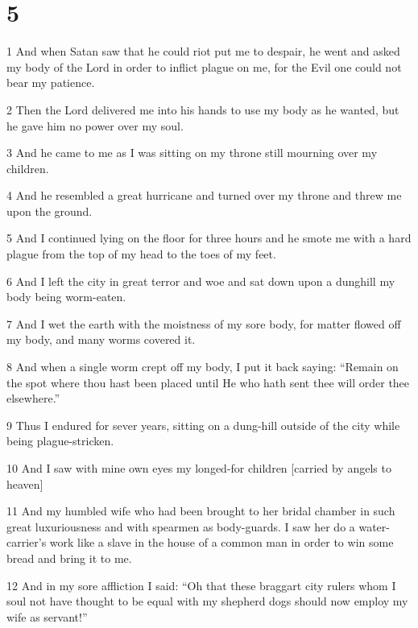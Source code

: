 \chapter{5}

\par 1 And when Satan saw that he could riot put me to despair, he went and asked my body of the Lord in order to inflict plague on me, for the Evil one could not bear my patience.

\par 2 Then the Lord delivered me into his hands to use my body as he wanted, but he gave him no power over my soul. 

\par 3 And he came to me as I was sitting on my throne still mourning over my children.

\par 4 And he resembled a great hurricane and turned over my throne and threw me upon the ground.

\par 5 And I continued lying on the floor for three hours and he smote me with a hard plague from the top of my head to the toes of my feet.

\par 6 And I left the city in great terror and woe and sat down upon a dunghill my body being worm-eaten.

\par 7 And I wet the earth with the moistness of my sore body, for matter flowed off my body, and many worms covered it.

\par 8 And when a single worm crept off my body, I put it back saying: “Remain on the spot where thou hast been placed until He who hath sent thee will order thee elsewhere.”

\par 9 Thus I endured for sever years, sitting on a dung-hill outside of the city while being plague-stricken.

\par 10 And I saw with mine own eyes my longed-for children [carried by angels to heaven]

\par 11 And my humbled wife who had been brought to her bridal chamber in such great luxuriousness and with spearmen as body-guards. I saw her do a water-carrier's work like a slave in the house of a common man in order to win some bread and bring it to me.

\par 12 And in my sore affliction I said: “Oh that these braggart city rulers whom I soul not have thought to be equal with my shepherd dogs should now employ my wife as servant!”

